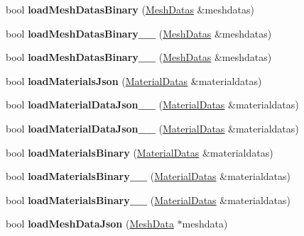 \begin{DoxyCompactItemize}
bool {\bfseries load\+Mesh\+Datas\+Binary} (\hyperlink{structMeshDatas}{Mesh\+Datas} \&meshdatas)
\item 
\mbox{\label{classBundle3D_accc23e1db385884932671f93b36c294e}} 
bool {\bfseries load\+Mesh\+Datas\+Binary\+\_\+\_} (\hyperlink{structMeshDatas}{Mesh\+Datas} \&meshdatas)
\item 
\mbox{\label{classBundle3D_a0e78626278f6d38a7c9aeca08301b6bd}} 
bool {\bfseries load\+Mesh\+Datas\+Binary\+\_\+\_} (\hyperlink{structMeshDatas}{Mesh\+Datas} \&meshdatas)
\item 
\mbox{\label{classBundle3D_a3c0fcdbe60122bdd2959cbcb3620d5a9}} 
bool {\bfseries load\+Materials\+Json} (\hyperlink{structMaterialDatas}{Material\+Datas} \&materialdatas)
\item 
\mbox{\label{classBundle3D_a88eb1243de98974ec6ce6673139a5002}} 
bool {\bfseries load\+Material\+Data\+Json\+\_\+\_} (\hyperlink{structMaterialDatas}{Material\+Datas} \&materialdatas)
\item 
\mbox{\label{classBundle3D_a2127473dc7b6e921ccfb6da63fee147e}} 
bool {\bfseries load\+Material\+Data\+Json\+\_\+\_} (\hyperlink{structMaterialDatas}{Material\+Datas} \&materialdatas)
\item 
\mbox{\label{classBundle3D_a0b164bb390a863acb0f3f3099843641a}} 
bool {\bfseries load\+Materials\+Binary} (\hyperlink{structMaterialDatas}{Material\+Datas} \&materialdatas)
\item 
\mbox{\label{classBundle3D_af372519f7bdc9027079b9af883944d2b}} 
bool {\bfseries load\+Materials\+Binary\+\_\+\_} (\hyperlink{structMaterialDatas}{Material\+Datas} \&materialdatas)
\item 
\mbox{\label{classBundle3D_a48cb5a678aebe33cc4407cf740112d3a}} 
bool {\bfseries load\+Materials\+Binary\+\_\+\_} (\hyperlink{structMaterialDatas}{Material\+Datas} \&materialdatas)
\item 
\mbox{\label{classBundle3D_a532229046a8cca11011bb82254fcdf3d}} 
bool {\bfseries load\+Mesh\+Data\+Json} (\hyperlink{structMeshData}{Mesh\+Data} $\ast$meshdata)

\end{DoxyCompactItemize}
